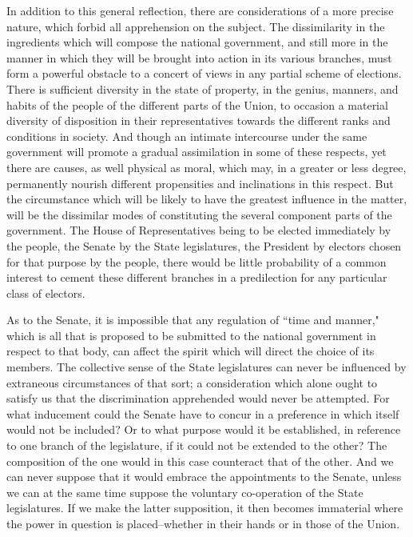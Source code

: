 In addition to this general reflection, there are considerations of a more precise nature, which forbid all apprehension on the subject. The dissimilarity in the ingredients which will compose the national government, and still more in the manner in which they will be brought into action in its various branches, must form a powerful obstacle to a concert of views in any partial scheme of elections. There is sufficient diversity in the state of property, in the genius, manners, and habits of the people of the different parts of the Union, to occasion a material diversity of disposition in their representatives towards the different ranks and conditions in society. And though an intimate intercourse under the same government will promote a gradual assimilation in some of these respects, yet there are causes, as well physical as moral, which may, in a greater or less degree, permanently nourish different propensities and inclinations in this respect. But the circumstance which will be likely to have the greatest influence in the matter, will be the dissimilar modes of constituting the several component parts of the government. The House of Representatives being to be elected immediately by the people, the Senate by the State legislatures, the President by electors chosen for that purpose by the people, there would be little probability of a common interest to cement these different branches in a predilection for any particular class of electors.

As to the Senate, it is impossible that any regulation of ``time and manner," which is all that is proposed to be submitted to the national government in respect to that body, can affect the spirit which will direct the choice of its members. The collective sense of the State legislatures can never be influenced by extraneous circumstances of that sort; a consideration which alone ought to satisfy us that the discrimination apprehended would never be attempted. For what inducement could the Senate have to concur in a preference in which itself would not be included? Or to what purpose would it be established, in reference to one branch of the legislature, if it could not be extended to the other? The composition of the one would in this case counteract that of the other. And we can never suppose that it would embrace the appointments to the Senate, unless we can at the same time suppose the voluntary co-operation of the State legislatures. If we make the latter supposition, it then becomes immaterial where the power in question is placed--whether in their hands or in those of the Union.

